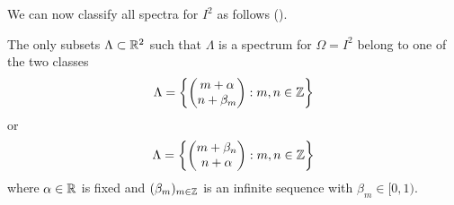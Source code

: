\documentclass[../thesis.tex]{subfiles}
\begin{document}
We can now classify all spectra for $I^2$ as follows (\cite{jorgensenSpectralPairsCartesian2001}). 
\begin{theorem}\label{thrm:class_all_shift_2d}
    The only subsets $\Lambda \subset \mathbb{R}^2$ such that $\Lambda$ is a spectrum for $\Omega = I^2$ belong to one of the two classes
    \begin{equation}\label{eq:2d_all_shift_class_1}
        \Lambda = \left\{
            \begin{pmatrix}
            m + \alpha \\
            n + \beta_m
            \end{pmatrix} : m,n \in  \mathbb{Z}
            \right\}
    \end{equation}
    or
    \begin{equation}\label{eq:2d_all_shift_class_2}
        \Lambda = \left\{
            \begin{pmatrix}
            m + \beta_n\\
            n + \alpha
            \end{pmatrix} : m,n \in  \mathbb{Z}
            \right\}
    \end{equation}
    where $\alpha \in \mathbb{R}$ is fixed and $(\beta_m)_{m\in \mathbb{Z}}$ is an infinite sequence with $\beta_m \in [0,1)$.
\end{theorem}
\end{document}
